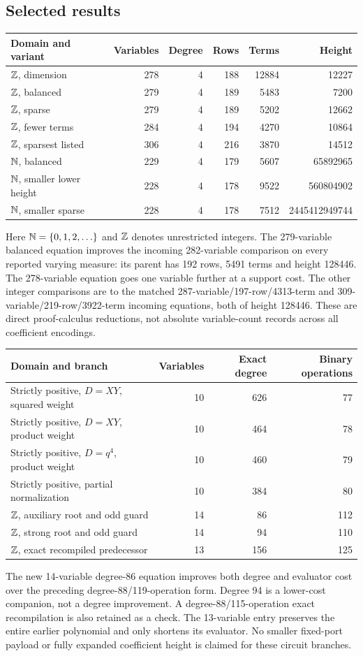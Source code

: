\subsection{Selected results}
\begin{center}\small
\begin{tabular}{lrrrrr}\toprule
Domain and variant & Variables & Degree & Rows & Terms & Height\\\midrule
$\mathbb Z$, dimension &278&4&188&12884&12227\\
$\mathbb Z$, balanced &279&4&189&5483&7200\\
$\mathbb Z$, sparse &279&4&189&5202&12662\\
$\mathbb Z$, fewer terms &284&4&194&4270&10864\\
$\mathbb Z$, sparsest listed &306&4&216&3870&14512\\\midrule
$\mathbb N$, balanced &229&4&179&5607&65892965\\
$\mathbb N$, smaller lower height &228&4&178&9522&560804902\\
$\mathbb N$, smaller sparse &228&4&178&7512&2445412949744\\\bottomrule
\end{tabular}
\end{center}
Here $\mathbb N=\{0,1,2,\ldots\}$ and $\mathbb Z$ denotes unrestricted integers.
The 279-variable balanced equation improves the incoming 282-variable
comparison on every reported varying measure: its parent has 192 rows,
5491 terms and height 128446. The 278-variable equation goes one variable
further at a support cost. The other integer comparisons are to the
matched 287-variable/197-row/4313-term and
309-variable/219-row/3922-term incoming equations, both of height 128446.
These are direct proof-calculus reductions, not absolute variable-count
records across all coefficient encodings.

\begin{center}
\begin{tabular}{lrrr}\toprule
Domain and branch & Variables & Exact degree & Binary operations\\\midrule
Strictly positive, $D=XY$, squared weight &10&626&77\\
Strictly positive, $D=XY$, product weight &10&464&78\\
Strictly positive, $D=q^4$, product weight &10&460&79\\
Strictly positive, partial normalization &10&384&80\\\midrule
$\mathbb Z$, auxiliary root and odd guard &14&86&112\\
$\mathbb Z$, strong root and odd guard &14&94&110\\
$\mathbb Z$, exact recompiled predecessor &13&156&125\\\bottomrule
\end{tabular}
\end{center}
The new 14-variable degree-86 equation improves both degree and evaluator
cost over the preceding degree-88/119-operation form. Degree 94 is a
lower-cost companion, not a degree improvement. A degree-88/115-operation
exact recompilation is also retained as a check. The 13-variable entry
preserves the entire earlier polynomial and only shortens its evaluator.
No smaller fixed-port payload or fully expanded coefficient height is
claimed for these circuit branches.
